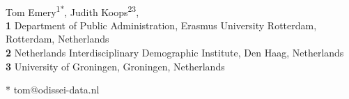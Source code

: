 \documentclass[10pt,letterpaper]{article}
\begin{document}
\vspace*{0.2in}

\begin{flushleft}
{\Large
\textbf{} %
}
\newline
\\
Tom Emery\textsuperscript{1*},
Judith Koops\textsuperscript{2}\textsuperscript{3},
\\
\bigskip
\textbf{1} Department of Public Administration, Erasmus University Rotterdam, Rotterdam, Netherlands
\\
\textbf{2} Netherlands Interdisciplinary Demographic Institute, Den Haag, Netherlands
\\
\textbf{3} University of Groningen, Groningen, Netherlands
\\
\bigskip

% 


* tom@odissei-data.nl

\end{flushleft}
\end{document}
